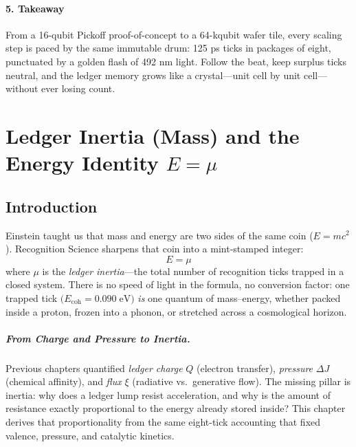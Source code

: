 \documentclass[11pt,oneside]{book}
\begin{document}
\subsubsection*{5. Takeaway}

From a 16-qubit Pickoff proof-of-concept to a 64-kqubit wafer tile,
every scaling step is paced by the same immutable drum:
125 ps ticks in packages of eight, punctuated by a golden flash of
492 nm light.  
Follow the beat, keep surplus ticks neutral, and the ledger memory grows
like a crystal—unit cell by unit cell—without ever losing count.

\bigskip
\chapter{Ledger Inertia (Mass) and the Energy Identity \texorpdfstring{$E=\mu$}{E = μ}}
\label{chap:ledger-mass}

\section*{Introduction}


Einstein taught us that mass and energy are two sides of the same coin
(\(E = mc^{2}\)).  
Recognition Science sharpens that coin into a mint-stamped integer:
\[
   \boxed{\;E = \mu\;}
\]
where \(\mu\) is the \emph{ledger inertia}—the total number of
recognition ticks trapped in a closed system.  
There is no speed of light in the formula, no conversion factor:
one trapped tick \(\bigl(E_{\text{coh}} = 0.090\;\text{eV}\bigr)\) 
\emph{is} one quantum of mass–energy,
whether packed inside a proton, frozen into a phonon, or stretched across
a cosmological horizon.

\paragraph{From Charge and Pressure to Inertia.}
Previous chapters quantified
\emph{ledger charge} \(Q\) (electron transfer),  
\emph{pressure} \(\Delta J\) (chemical affinity),  
and \emph{flux} \(\xi\) (radiative vs.\ generative flow).
The missing pillar is inertia:
why does a ledger lump resist acceleration, and why is the amount of
resistance exactly proportional to the energy already stored inside?
This chapter derives that proportionality from the same eight-tick
accounting that fixed valence, pressure, and catalytic kinetics.
\end{document}
